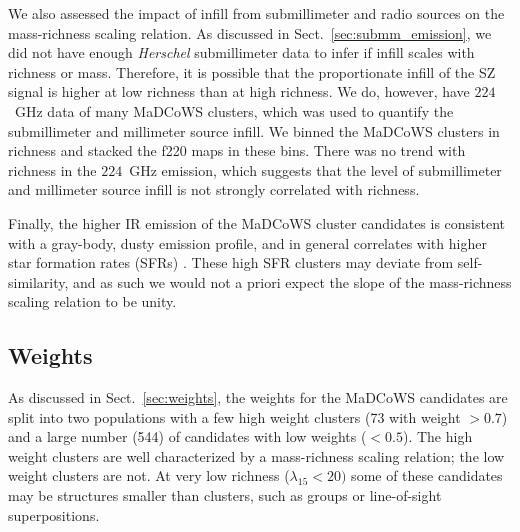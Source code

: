 \documentclass[longauth]{aa} %
\newcommand{\madcows}{MaDCoWS\xspace}
\begin{document}
We also assessed the impact of infill from submillimeter and radio sources on the mass-richness scaling relation. As discussed in Sect.~\ref{sec:submm_emission}, we did not have enough {\it Herschel} submillimeter data to infer if infill scales with richness or mass. Therefore, it is possible that the proportionate infill of the SZ signal is higher at low richness than at high richness. We do, however, have $224$~GHz data of many \madcows clusters, which was used to quantify the submillimeter and millimeter source infill. We binned the \madcows clusters in richness and stacked the f220 maps in these bins. There was no trend with richness in the $224$~GHz emission, which suggests that the level of submillimeter and millimeter source infill is not strongly correlated with richness. 

Finally, the higher IR emission of the \madcows cluster candidates is consistent with a gray-body, dusty emission profile, and in general correlates with higher star formation rates (SFRs) \citep[see e.g.,][]{Devlin2009}.
These high SFR clusters may deviate from self-similarity, and as such we would not a priori expect the slope of the mass-richness scaling relation to be unity. 

\subsection{Weights}\label{sec:weights_disc}

As discussed in Sect.~\ref{sec:weights}, the weights for the \madcows candidates are split into two populations with a few high weight clusters (73 with weight $>0.7$) and a large number (544) of candidates with low weights ($<0.5$). The high weight clusters are well characterized by a mass-richness scaling relation; the low weight clusters are not. At very low richness ($\lambda_{15} < 20)$ some of these candidates may be structures smaller than clusters, such as groups or line-of-sight superpositions. 
\end{document}

